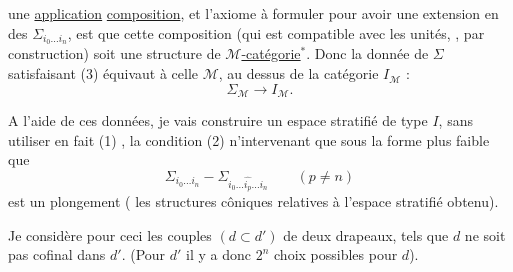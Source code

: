une \uline{application} \uline{composition}, et l'axiome à
formuler pour avoir une extension 
en des \(\Sigma_{i_0\ldots i_n}\), est que cette composition
(qui est compatible avec les unités, ,
par construction) soit une structure de
\uline{\(\mathcal M\)-catégorie}\(^*\). 
Donc la donnée de \(\Sigma\) satisfaisant (3)
équivaut à celle   \(\mathcal M\),
au dessus de la catégorie \(I_{\mathcal M}\) :
\[
 \Sigma_{\mathcal M}\longrightarrow I_{\mathcal M}.
\]


A l'aide de ces données, je vais
construire un espace stratifié de type \(I\),
sans utiliser en fait 
(1) , la condition (2) n'intervenant
que sous la forme plus faible que
\[
 \Sigma_{i_0\ldots i_n}
 -\Sigma_{i_0\ldots\widehat{i_p}\ldots i_n}\qquad(p\ne n)
\]
est un plongement 
( les structures côniques
relatives à l'espace stratifié obtenu).

Je considère pour ceci les couples
 \((d\subset d')\) de deux drapeaux,
 tels que
\(d\)  ne soit pas cofinal dans \(d'\).
(Pour \(d'\) 
il y a donc \(2^n\) choix possibles pour \(d\)).

